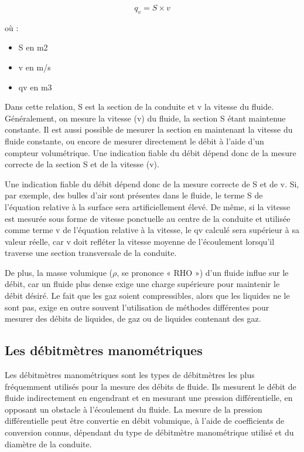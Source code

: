 \[ q_{v} = S \times v \] 

où : \begin{itemize}  
\item 	S en m2
\item 	v en m/s
\item 	qv en m3
\end{itemize}

Dans cette relation, S est la section de la conduite et v la vitesse du fluide.
Généralement, on mesure la vitesse (v) du fluide, la section S étant maintenue constante. 
Il est aussi possible de mesurer la section en maintenant la vitesse du fluide constante, ou encore de mesurer directement le débit à l’aide d’un compteur volumétrique.
Une indication fiable du débit dépend donc de la mesure correcte de la section S et de la vitesse (v).
\vspace{0.3cm}

Une indication fiable du débit dépend donc de la mesure correcte de S et de v.
Si, par exemple, des bulles d’air sont présentes dans le fluide, le terme S de l’équation relative à la surface sera artificiellement élevé. De même, si la vitesse est mesurée sous forme de vitesse ponctuelle au centre de la conduite et utilisée comme terme v de l’équation relative à la vitesse, le qv calculé sera supérieur à sa valeur réelle, car v doit refléter la vitesse moyenne de l’écoulement lorsqu’il traverse une section transversale de la conduite.
\vspace{0.3cm}

De plus, la masse volumique ($ \rho $, se prononce « RHO ») d’un fluide influe sur le débit, car un fluide plus dense exige une charge supérieure pour maintenir le débit désiré. Le fait que les gaz soient compressibles, alors que les liquides ne le sont pas, exige en outre souvent l’utilisation de méthodes différentes pour mesurer des débits de liquides, de gaz ou de liquides contenant des gaz.


\subsection{Les débitmètres manométriques}

Les débitmètres manométriques sont les types de débitmètres les plus fréquemment utilisés pour la mesure des débits de fluide. Ils mesurent le débit de fluide indirectement en engendrant et en mesurant une pression différentielle, en opposant un obstacle à l’écoulement du fluide. La mesure de la pression différentielle peut être convertie en débit volumique, à l’aide de coefficients de conversion connus, dépendant du type de débitmètre manométrique utilisé et du diamètre de la conduite.
\vspace{0.3cm}


